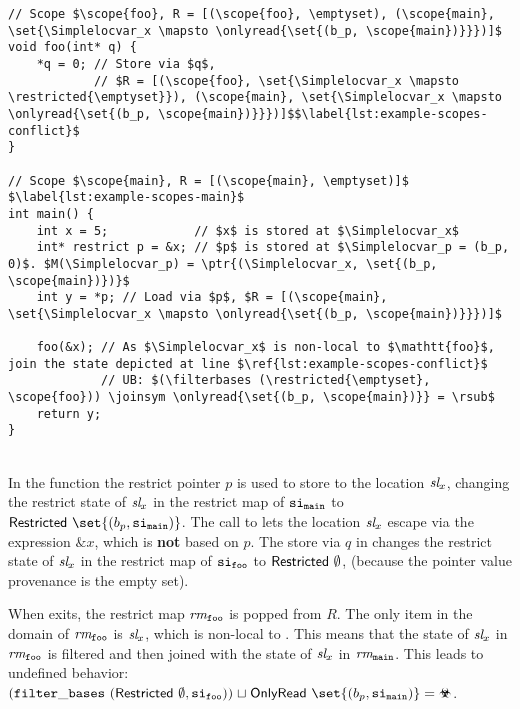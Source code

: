 \newpage

\begin{code}
\begin{verbatim}
// Scope $\scope{foo}, R = [(\scope{foo}, \emptyset), (\scope{main}, \set{\Simplelocvar_x \mapsto \onlyread{\set{(b_p, \scope{main})}}})]$
void foo(int* q) {
    *q = 0; // Store via $q$,
            // $R = [(\scope{foo}, \set{\Simplelocvar_x \mapsto \restricted{\emptyset}}), (\scope{main}, \set{\Simplelocvar_x \mapsto \onlyread{\set{(b_p, \scope{main})}}})]$$\label{lst:example-scopes-conflict}$
}

// Scope $\scope{main}, R = [(\scope{main}, \emptyset)]$ $\label{lst:example-scopes-main}$
int main() {
    int x = 5;            // $x$ is stored at $\Simplelocvar_x$
    int* restrict p = &x; // $p$ is stored at $\Simplelocvar_p = (b_p, 0)$. $M(\Simplelocvar_p) = \ptr{(\Simplelocvar_x, \set{(b_p, \scope{main})})}$
    int y = *p; // Load via $p$, $R = [(\scope{main}, \set{\Simplelocvar_x \mapsto \onlyread{\set{(b_p, \scope{main})}}})]$

    foo(&x); // As $\Simplelocvar_x$ is non-local to $\mathtt{foo}$, join the state depicted at line $\ref{lst:example-scopes-conflict}$
             // UB: $(\filterbases (\restricted{\emptyset}, \scope{foo})) \joinsym \onlyread{\set{(b_p, \scope{main})}} = \rsub$
    return y;
}
\end{verbatim}
\label{lst:example-scopes-ub}
\end{code}
\leavevmode
\\

In the function  the restrict pointer $p$ is used to store to the location $\textit{sl}_x$,
changing the restrict state of $\textit{sl}_x$ in the restrict map of $\mathtt{si}_\mathtt{main}$ to $\restricted{\set{(b_p, \scope{main})}}$.
The call to  lets the location $\textit{sl}_x$ escape via the expression $\&x$, which is \textbf{not} based on $p$.
The store via $q$ in  changes the restrict state of $\textit{sl}_x$ in the restrict map of $\mathtt{si}_\mathtt{foo}$ to $\mathsf{Restricted} \ \emptyset$,
(because the pointer value provenance is the empty set).

When  exits, the restrict map $\textit{rm}_\mathtt{foo}$ is popped from $R$.
The only item in the domain of $\textit{rm}_\mathtt{foo}$ is $\textit{sl}_x$, which is non-local to .
This means that the state of $\textit{sl}_x$ in $\textit{rm}_\mathtt{foo}$ is filtered and then joined with the state of $\textit{sl}_x$ in $\textit{rm}_\mathtt{main}$.
This leads to undefined behavior: $(\filterbases \ (\restricted{\emptyset}, \scope{foo})) \joinsym \onlyread{\set{(b_p, \scope{main})}} = \rsub$.


